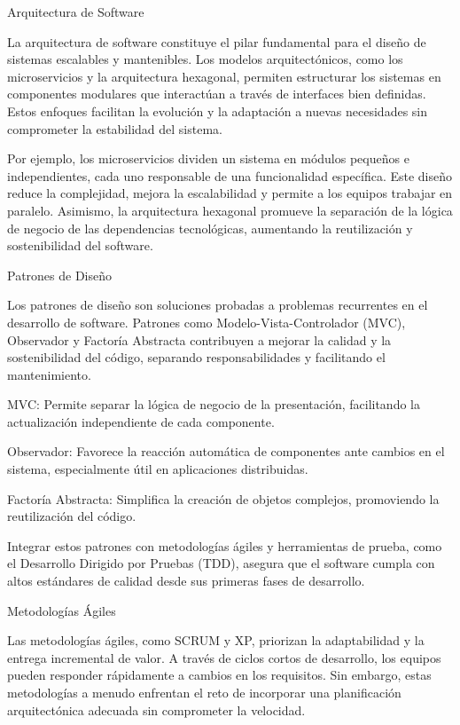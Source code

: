 \documentclass[12pt]{article}
\begin{document}
Arquitectura de Software

La arquitectura de software constituye el pilar fundamental para el diseño de sistemas escalables y mantenibles. Los modelos arquitectónicos, como los microservicios y la arquitectura hexagonal, permiten estructurar los sistemas en componentes modulares que interactúan a través de interfaces bien definidas. Estos enfoques facilitan la evolución y la adaptación a nuevas necesidades sin comprometer la estabilidad del sistema.

Por ejemplo, los microservicios dividen un sistema en módulos pequeños e independientes, cada uno responsable de una funcionalidad específica. Este diseño reduce la complejidad, mejora la escalabilidad y permite a los equipos trabajar en paralelo. Asimismo, la arquitectura hexagonal promueve la separación de la lógica de negocio de las dependencias tecnológicas, aumentando la reutilización y sostenibilidad del software.

Patrones de Diseño

Los patrones de diseño son soluciones probadas a problemas recurrentes en el desarrollo de software. Patrones como Modelo-Vista-Controlador (MVC), Observador y Factoría Abstracta contribuyen a mejorar la calidad y la sostenibilidad del código, separando responsabilidades y facilitando el mantenimiento.

MVC: Permite separar la lógica de negocio de la presentación, facilitando la actualización independiente de cada componente.

Observador: Favorece la reacción automática de componentes ante cambios en el sistema, especialmente útil en aplicaciones distribuidas.

Factoría Abstracta: Simplifica la creación de objetos complejos, promoviendo la reutilización del código.

Integrar estos patrones con metodologías ágiles y herramientas de prueba, como el Desarrollo Dirigido por Pruebas (TDD), asegura que el software cumpla con altos estándares de calidad desde sus primeras fases de desarrollo.

Metodologías Ágiles

Las metodologías ágiles, como SCRUM y XP, priorizan la adaptabilidad y la entrega incremental de valor. A través de ciclos cortos de desarrollo, los equipos pueden responder rápidamente a cambios en los requisitos. Sin embargo, estas metodologías a menudo enfrentan el reto de incorporar una planificación arquitectónica adecuada sin comprometer la velocidad.
\end{document}
